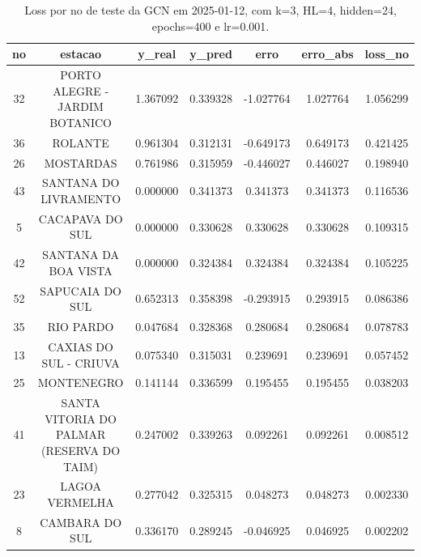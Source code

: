 \begin{table}[h]
\centering
\caption{Loss por no de teste da GCN em 2025-01-12, com k=3, HL=4, hidden=24, epochs=400 e lr=0.001.}
\label{tab:gcn_loss_k3_hl4_h24_e400_d20250112}
\begin{tabular}{ccccccc}
\toprule
no & estacao & y\_real & y\_pred & erro & erro\_abs & loss\_no \\
\midrule
32 & PORTO ALEGRE - JARDIM BOTANICO & 1.367092 & 0.339328 & -1.027764 & 1.027764 & 1.056299 \\
36 & ROLANTE & 0.961304 & 0.312131 & -0.649173 & 0.649173 & 0.421425 \\
26 & MOSTARDAS & 0.761986 & 0.315959 & -0.446027 & 0.446027 & 0.198940 \\
43 & SANTANA DO LIVRAMENTO & 0.000000 & 0.341373 & 0.341373 & 0.341373 & 0.116536 \\
5 & CACAPAVA DO SUL & 0.000000 & 0.330628 & 0.330628 & 0.330628 & 0.109315 \\
42 & SANTANA DA BOA VISTA & 0.000000 & 0.324384 & 0.324384 & 0.324384 & 0.105225 \\
52 & SAPUCAIA DO SUL & 0.652313 & 0.358398 & -0.293915 & 0.293915 & 0.086386 \\
35 & RIO PARDO & 0.047684 & 0.328368 & 0.280684 & 0.280684 & 0.078783 \\
13 & CAXIAS DO SUL - CRIUVA & 0.075340 & 0.315031 & 0.239691 & 0.239691 & 0.057452 \\
25 & MONTENEGRO & 0.141144 & 0.336599 & 0.195455 & 0.195455 & 0.038203 \\
41 & SANTA VITORIA DO PALMAR (RESERVA DO TAIM) & 0.247002 & 0.339263 & 0.092261 & 0.092261 & 0.008512 \\
23 & LAGOA VERMELHA & 0.277042 & 0.325315 & 0.048273 & 0.048273 & 0.002330 \\
8 & CAMBARA DO SUL & 0.336170 & 0.289245 & -0.046925 & 0.046925 & 0.002202 \\
\bottomrule
\end{tabular}
\end{table}
